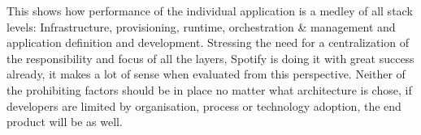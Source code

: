 This shows how performance of the individual application is a medley of all stack levels: Infrastructure, provisioning, runtime, orchestration & management and application definition and development. Stressing the need for a centralization of the responsibility and focus of all the layers, Spotify is doing it with great success already, it makes a lot of sense when evaluated from this perspective. Neither of the prohibiting factors should be in place no matter what architecture is chose, if developers are limited by organisation, process or technology adoption, the end product will be as well.


